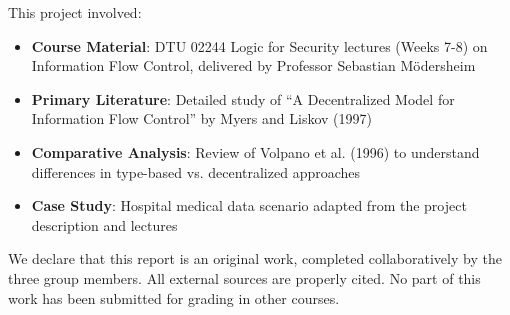 This project involved:
\begin{itemize}
    \item \textbf{Course Material}: DTU 02244 Logic for Security lectures (Weeks 7-8) on Information Flow Control, delivered by Professor Sebastian Mödersheim
    \item \textbf{Primary Literature}: Detailed study of ``A Decentralized Model for Information Flow Control'' by Myers and Liskov (1997)
    \item \textbf{Comparative Analysis}: Review of Volpano et al. (1996) to understand differences in type-based vs. decentralized approaches
    \item \textbf{Case Study}: Hospital medical data scenario adapted from the project description and lectures
\end{itemize}

We declare that this report is an original work, completed collaboratively by the three group members. All external sources are properly cited. No part of this work has been submitted for grading in other courses.
